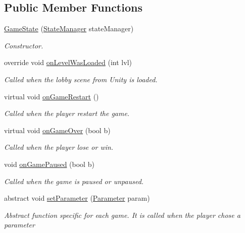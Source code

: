\subsection*{Public Member Functions}
\begin{DoxyCompactItemize}
\item 
\hyperlink{class_game_state_af49ddbcc92ea9d0ceb8c80a784689ae7}{Game\-State} (\hyperlink{class_state_manager}{State\-Manager} state\-Manager)
\begin{DoxyCompactList}\small\item\em Constructor.\end{DoxyCompactList}\item 
override void \hyperlink{class_game_state_ac06d5f671d7c46ffcdf76c827fb0f7fc}{on\-Level\-Was\-Loaded} (int lvl)
\begin{DoxyCompactList}\small\item\em Called when the lobby scene from Unity is loaded.\end{DoxyCompactList}\item 
virtual void \hyperlink{class_game_state_ac596022cb9b545666b26e17aee3f080b}{on\-Game\-Restart} ()
\begin{DoxyCompactList}\small\item\em Called when the player restart the game.\end{DoxyCompactList}\item 
virtual void \hyperlink{class_game_state_abda5b28f6a91641e7a958e958349abde}{on\-Game\-Over} (bool b)
\begin{DoxyCompactList}\small\item\em Called when the player lose or win.\end{DoxyCompactList}\item 
void \hyperlink{class_game_state_a23d5c1bb67a10cee5d6609355beb335a}{on\-Game\-Paused} (bool b)
\begin{DoxyCompactList}\small\item\em Called when the game is paused or unpaused.\end{DoxyCompactList}\item 
abstract void \hyperlink{class_game_state_a8e97b9fe8964321bfa0882bfb5b7e98e}{set\-Parameter} (\hyperlink{class_parameter}{Parameter} param)
\begin{DoxyCompactList}\small\item\em Abstract function specific for each game. It is called when the player chose a parameter\end{DoxyCompactList}\item 

\end{DoxyCompactItemize}

